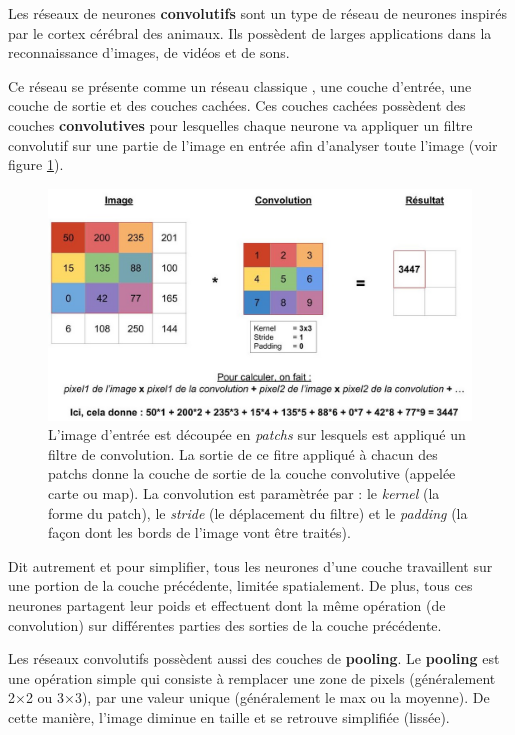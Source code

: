 Les réseaux de neurones \textbf{convolutifs} sont un type de réseau de neurones
inspirés par le cortex cérébral des animaux.
Ils possèdent de larges applications dans la reconnaissance d'images, de vidéos
et de sons.

Ce réseau se présente comme un réseau classique , une couche d'entrée,
une couche de sortie et des couches cachées.
Ces couches cachées possèdent des couches \textbf{convolutives}
pour lesquelles chaque neurone va appliquer un filtre convolutif
sur une partie de l'image en entrée afin d'analyser toute l'image
(voir figure \ref{fig:explication_convolution}).

\begin{figure}[h!]
\centering
\includegraphics[width=12cm]{./images/explication_convolution.jpg}
\caption[Schéma de la convolution.]{L'image d'entrée est découpée en \textit{patchs}
sur lesquels est appliqué un filtre de convolution.
La sortie de ce fitre appliqué à chacun des patchs donne la couche de sortie
de la couche convolutive (appelée carte ou map).
La convolution est paramètrée par : le \textit{kernel} (la forme du patch),
le \textit{stride} (le déplacement du filtre) et le \textit{padding}
(la façon dont les bords de l'image vont être traités).
\label{fig:explication_convolution}}
\end{figure}

Dit autrement et pour simplifier, tous les neurones d'une couche travaillent
sur une portion de la couche précédente, limitée spatialement.
De plus, tous ces neurones partagent leur poids et effectuent dont la même
opération (de convolution) sur différentes parties des sorties de la couche
précédente.

Les réseaux convolutifs possèdent aussi des couches de \textbf{pooling}.
Le \textbf{pooling} est une opération simple qui consiste à remplacer une zone
de pixels (généralement 2×2 ou 3×3), par une valeur unique
(généralement le max ou la moyenne).
De cette manière, l’image diminue en taille et se retrouve simplifiée (lissée).

